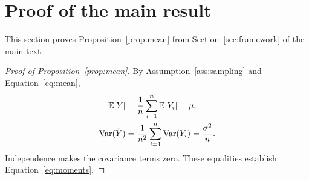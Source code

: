 \setcounter{page}{1}
\renewcommand{\thepage}{S\arabic{page}}
\setcounter{section}{0}
\setcounter{equation}{0}
\setcounter{table}{0}
\setcounter{figure}{0}
\setcounter{proposition}{0}
\setcounter{corollary}{0}
\setcounter{assumption}{0}
\setcounter{definition}{0}
\renewcommand{\thesection}{S\arabic{section}}
\renewcommand{\theequation}{S\arabic{equation}}
\renewcommand{\thetable}{S\arabic{table}}
\renewcommand{\thefigure}{S\arabic{figure}}
\renewcommand{\theproposition}{S\arabic{proposition}}
\renewcommand{\thecorollary}{S\arabic{corollary}}
\renewcommand{\theassumption}{S\arabic{assumption}}
\renewcommand{\thedefinition}{S\arabic{definition}}
\renewcommand{\theHsection}{S\arabic{section}}
\renewcommand{\theHequation}{S\arabic{equation}}
\renewcommand{\theHtable}{S\arabic{table}}
\renewcommand{\theHfigure}{S\arabic{figure}}
\renewcommand{\theHproposition}{S\arabic{proposition}}
\providecommand{\theHcorollary}{\arabic{corollary}}
\providecommand{\theHassumption}{\arabic{assumption}}
\providecommand{\theHdefinition}{\arabic{definition}}
\renewcommand{\theHcorollary}{S\arabic{corollary}}
\renewcommand{\theHassumption}{S\arabic{assumption}}
\renewcommand{\theHdefinition}{S\arabic{definition}}
\allowdisplaybreaks[0]
\makeatletter
\let\SIoriginaladdtocontents\addtocontents
\renewcommand{\addtocontents}[2]{
  \def\SIextension{#1}
  \def\SItoc{toc}
  \ifx\SIextension\SItoc
    \SIoriginaladdtocontents{sitoc}{#2}
  \else
    \SIoriginaladdtocontents{#1}{#2}
  \fi
}
\renewcommand*{\l@section}[2]{\begingroup\bfseries\@dottedtocline{1}{0em}{2.2em}{#1}{#2}\endgroup}

\begingroup
\def\@title{Supplementary Information for\\``Manuscript Title''}
\def\@author{Author One \and Author Two}
\def\@date{}
\let\and\SIoriginaland
\SIoriginalmaketitle
\endgroup
\thispagestyle{plain}
\makeatother
{\setcounter{tocdepth}{1}\makeatletter
\let\SIoriginalstarttoc\@starttoc
\renewcommand{\@starttoc}[1]{\SIoriginalstarttoc{sitoc}}
\tableofcontents
\makeatother}
\clearpage
\onehalfspacing

\section{Proof of the main result}\label{SI-sec:proof}

This section proves Proposition~\ref{prop:mean} from Section~\ref{sec:framework} of the main text.

\begin{proof}[Proof of Proposition~\ref{prop:mean}]
By Assumption~\ref{ass:sampling} and Equation~\eqref{eq:mean},
\begin{align}
\mathbb{E}[\bar Y]
&=\frac{1}{n}\sum_{i=1}^{n}\mathbb{E}[Y_i]
=\mu,\label{SI-eq:expectation}\\
\operatorname{Var}(\bar Y)
&=\frac{1}{n^2}\sum_{i=1}^{n}\operatorname{Var}(Y_i)
=\frac{\sigma^2}{n}.\label{SI-eq:variance}
\end{align}
Independence makes the covariance terms zero. These equalities establish Equation~\eqref{eq:moments}.
\end{proof}


